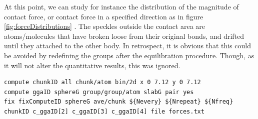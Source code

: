 \documentclass[twoside,english]{uiofysmaster}
\begin{document}
At this point, we can study for instance the distribution of the magnitude of contact force, or contact force in a specified direction as in figure \ref{fig:forceDistributions} .
The speckles outside the contact area are atoms/molecules that have broken loose from their original bonds, and drifted until they attached to the other body. 
In retrospect, it is obvious that this could be avoided by redefining the groups after the equilibration procedure.
Though, as it will not alter the quantitative results, this was ignored.


 \begin{lstlisting}[language=LammpsInput, caption={Example usage of compute group/group/atom with spatial binning and time averaging.}, label={lst:usingCustomCompute} ]
compute chunkID all chunk/atom bin/2d x 0 7.12 y 0 7.12
compute ggaID sphereG group/group/atom slabG pair yes
fix fixComputeID sphereG ave/chunk ${Nevery} ${Nrepeat} ${Nfreq} chunkID c_ggaID[2] c_ggaID[3] c_ggaID[4] file forces.txt
\end{lstlisting}
\end{document}
